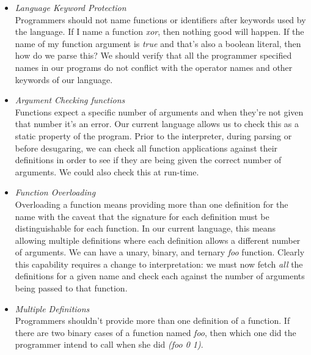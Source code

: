 \documentclass[10pt]{article}
\begin{document}
\begin{itemize}
\item \textit{Language Keyword Protection} \\
Programmers should not name functions or identifiers after keywords used by the language. If I name a function \textit{xor}, then nothing good will happen. If the name of my function argument is \textit{true} and that's also a boolean literal, then how do we parse this? We should verify that all the programmer specified names in our programs do not conflict with the operator names and other keywords of our language. 

\item \textit{Argument Checking functions} \\
Functions expect a specific number of arguments and when they're not given that number it's an error. Our current language allows us to check this as a static property of the program. Prior to the interpreter, during parsing or before desugaring, we can check all function applications against their definitions in order to see if they are being given the correct number of arguments.  We could also check this at run-time.  

\item \textit{Function Overloading} \\
Overloading a function means providing more than one definition for the name with the caveat that the signature for each definition must be distinguishable for each function. In our current language, this means allowing multiple definitions where each definition allows a different number of arguments. We can have a unary, binary, and ternary \textit{foo} function. Clearly this capability requires a change to interpretation: we must now fetch \textit{all} the definitions for a given name and check each against the number of arguments being passed to that function.  

\item \textit{Multiple Definitions} \\
Programmers shouldn't provide more than one definition of a function. If there are two binary cases of a function named \textit{foo}, then which one did the programmer intend to call when she did \textit{(foo 0 1)}. 
\end{itemize}
\end{document}
